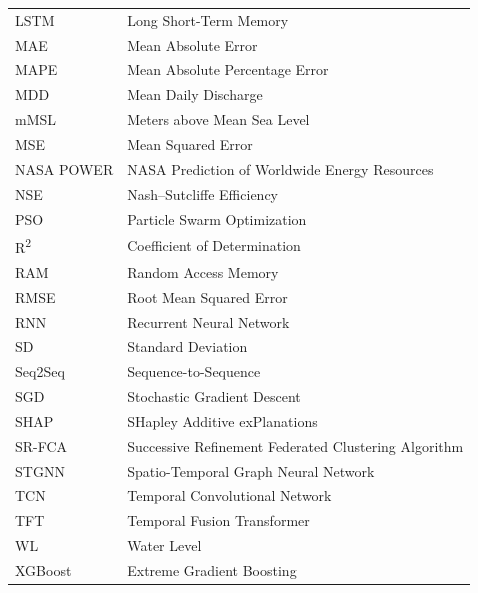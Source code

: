 \begin{longtable}{@{}p{3.2cm} p{11cm}@{}}
LSTM        & Long Short-Term Memory \\
MAE         & Mean Absolute Error \\
MAPE        & Mean Absolute Percentage Error \\
MDD         & Mean Daily Discharge \\
mMSL        & Meters above Mean Sea Level \\
MSE         & Mean Squared Error \\
NASA POWER  & NASA Prediction of Worldwide Energy Resources \\
NSE         & Nash--Sutcliffe Efficiency \\
PSO         & Particle Swarm Optimization \\
R\textsuperscript{2} & Coefficient of Determination \\
RAM         & Random Access Memory \\
RMSE        & Root Mean Squared Error \\
RNN         & Recurrent Neural Network \\
SD          & Standard Deviation \\
Seq2Seq     & Sequence-to-Sequence \\
SGD         & Stochastic Gradient Descent \\
SHAP        & SHapley Additive exPlanations \\
SR-FCA      & Successive Refinement Federated Clustering Algorithm \\
STGNN       & Spatio-Temporal Graph Neural Network \\
TCN         & Temporal Convolutional Network \\
TFT         & Temporal Fusion Transformer \\
WL          & Water Level \\
XGBoost     & Extreme Gradient Boosting \\
\hline
\end{longtable}
